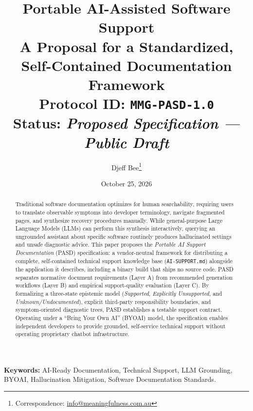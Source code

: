 \documentclass[12pt, a4paper]{article}
\title{
    \Large \textbf{Portable AI-Assisted Software Support} \\
    \large A Proposal for a Standardized, Self-Contained Documentation Framework \\
    \vspace{0.8em}
    \small Protocol ID: \texttt{MMG-PASD-1.0} \\
    \small \textbf{Status:} \textit{Proposed Specification --- Public Draft}
}
\author{\vspace{0.6em}Djeff Bee\thanks{Correspondence: \href{mailto:info@meaningfulness.com.au}{info@meaningfulness.com.au}}}
\affil{\vspace{-0.4em}\textit{Principal Architect, Meaningfulness Media Group}}
\date{\vspace{-0.4em}October 25, 2026}
\begin{document}
\maketitle
\vspace{-1.8em}

\thispagestyle{fancy}
\fancyhf{}
\renewcommand{\headrulewidth}{0pt}

\begin{abstract}
\noindent
Traditional software documentation optimizes for human searchability, requiring users to translate observable symptoms into developer terminology, navigate fragmented pages, and synthesize recovery procedures manually. While general-purpose Large Language Models (LLMs) can perform this synthesis interactively, querying an ungrounded assistant about specific software routinely produces hallucinated settings and unsafe diagnostic advice. This paper proposes the \textit{Portable AI Support Documentation} (PASD) specification: a vendor-neutral framework for distributing a complete, self-contained technical support knowledge base (\texttt{AI-SUPPORT.md}) alongside the application it describes, including a binary build that ships no source code. PASD separates normative document requirements (Layer A) from recommended generation workflows (Layer B) and empirical support-quality evaluation (Layer C). By formalizing a three-state epistemic model (\textit{Supported}, \textit{Explicitly Unsupported}, and \textit{Unknown/Undocumented}), explicit third-party responsibility boundaries, and symptom-oriented diagnostic trees, PASD establishes a testable support contract. Operating under a ``Bring Your Own AI'' (BYOAI) model, the specification enables independent developers to provide grounded, self-service technical support without operating proprietary chatbot infrastructure.
\end{abstract}

\vspace{0.4em}
\noindent\textbf{Keywords:} AI-Ready Documentation, Technical Support, LLM Grounding, BYOAI, Hallucination Mitigation, Software Documentation Standards.
\end{document}
